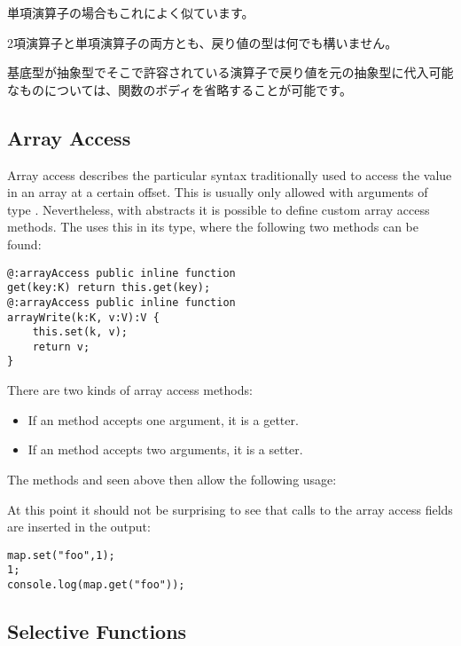 単項演算子の場合もこれによく似ています。


2項演算子と単項演算子の両方とも、戻り値の型は何でも構いません。

基底型が抽象型でそこで許容されている演算子で戻り値を元の抽象型に代入可能なものについては、関数のボディを省略することが可能です。


\subsection{Array Access}
\label{types-abstract-array-access}

Array access describes the particular syntax traditionally used to access the value in an array at a certain offset. This is usually only allowed with arguments of type . Nevertheless, with abstracts it is possible to define custom array access methods. The  uses this in its  type, where the following two methods can be found:

\begin{lstlisting}
@:arrayAccess public inline function
get(key:K) return this.get(key);
@:arrayAccess public inline function
arrayWrite(k:K, v:V):V {
	this.set(k, v);
	return v;
}
\end{lstlisting}
There are two kinds of array access methods:

\begin{itemize}
	\item If an  method accepts one argument, it is a getter.
	\item If an  method accepts two arguments, it is a setter.
\end{itemize}
The methods  and  seen above then allow the following usage:


At this point it should not be surprising to see that calls to the array access fields are inserted in the output:

\begin{lstlisting}
map.set("foo",1);
1;
console.log(map.get("foo"));
\end{lstlisting}


\subsection{Selective Functions}
\label{types-abstract-selective-functions}

